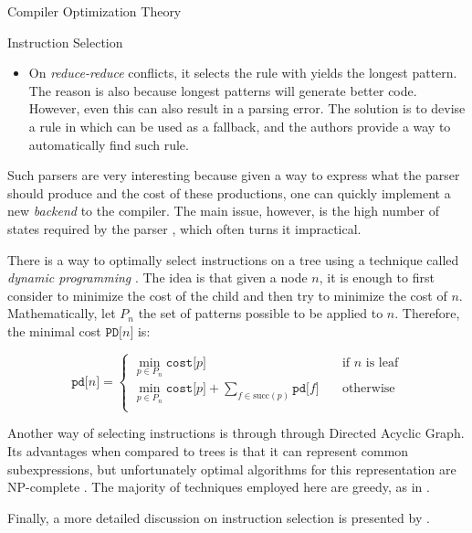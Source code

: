 \begin{section}{Compiler Optimization Theory}
\begin{subsection}{Instruction Selection}
\begin{itemize}
		\item On \textit{reduce-reduce} conflicts, it selects the rule with yields
		the longest pattern. The reason is also because longest patterns will generate
		better code. However, even this can also result in a parsing error. The
		solution is to devise a rule in which can be used as a fallback, and the
		authors provide a way to automatically find such rule.
	\end{itemize}

	Such parsers are very interesting because given a way to express what the parser
	should produce and the cost of these productions, one can quickly implement
	a new \textit{backend} to the compiler.
	The main issue, however, is the high number of states required by the
	parser \citep{blindell2016instruction}, which often turns it impractical.

	There is a way to optimally select instructions on a tree using a technique
	called \textit{dynamic programming} \citep{ripken1977formale}. The idea is
	that given a node $n$, it is enough to first consider to minimize the cost
	of the child and then try to minimize the cost of $n$. Mathematically, let
	$P_n$ the set of patterns possible to be applied to $n$. Therefore, the
	minimal cost $\texttt{PD[}n\texttt{]}$ is:

\[
    \texttt{pd[}n\texttt{]} =
     \begin{cases}
       \min_{p \in P_n} \texttt{cost[}p\texttt{]}  &\quad\text{if } n \text{ is leaf}\\
       \min_{p \in P_n} \texttt{cost[}p\texttt{]} + \sum_{f \in \text{succ}(p)} \texttt{pd[}f\texttt{]} &\quad\text{otherwise}\\
     \end{cases}
\]


	Another way of selecting instructions is through through Directed Acyclic Graph.
	Its advantages when compared to trees is that it can represent common
	subexpressions, but unfortunately optimal algorithms for this representation
	are NP-complete \citep{koes2008near}. The majority of techniques employed here
	are greedy, as in \cite{llvm_insn_selection}.

	Finally, a more detailed discussion on instruction selection is presented
	by \cite{blindell2016instruction}.

\end{subsection}

\end{section}

